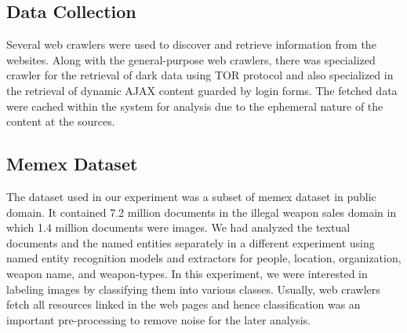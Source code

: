 \subsection{Data Collection}
\label{sec:memex-datacollection}
Several web crawlers were used to discover and retrieve information from the websites.
Along with the general-purpose web crawlers, there was specialized crawler for the retrieval of dark data using TOR protocol \cite{} and also specialized in the retrieval of dynamic AJAX content guarded by login forms. The fetched data were cached within the system for analysis due to the ephemeral nature of the content at the sources.

\subsection{Memex Dataset} \label{sec:memex-dataset}
The dataset used in our experiment was a subset of memex dataset in public domain. It contained 7.2 million documents in the illegal weapon sales domain in which 1.4 million documents were images. We had analyzed the textual documents and the named entities separately in a different experiment using named entity recognition models and extractors for people, location, organization, weapon name, and weapon-types. In this experiment, we were interested in labeling images by classifying them into various classes. Usually, web crawlers fetch all resources linked in the web pages and hence classification was an important pre-processing to remove noise for the later analysis.